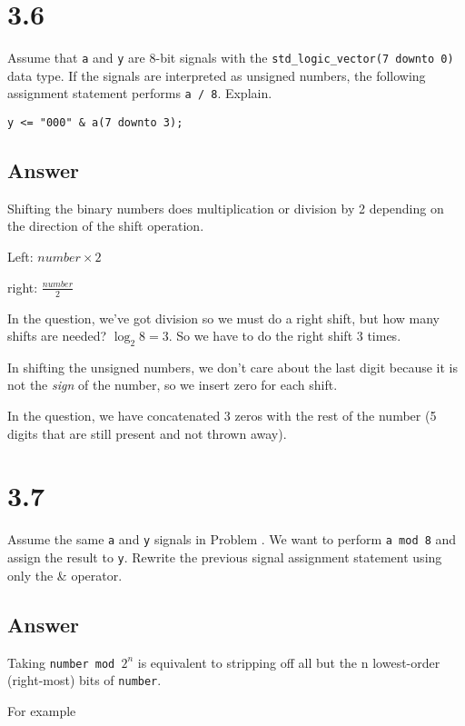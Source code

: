 \documentclass[dvipsnames, svgnames, x11names, a4paper,12pt]{article}
\begin{document}
\section{3.6}\label{3.6}
Assume that \texttt{a} and \texttt{y} are 8-bit signals with the \texttt{std\_logic\_vector(7 downto 0)}
data type. If the signals are interpreted as unsigned numbers, the following assignment
statement performs \texttt{a / 8}. Explain.

\begin{lstlisting}
y <= "000" & a(7 downto 3);
\end{lstlisting}

\subsection{Answer}
Shifting the binary numbers does multiplication or division by 2 depending on the direction of the shift operation. 
\begin{itemize*}
    \item Left: $number \times 2$
    \item right: $\frac{number}{2}$
\end{itemize*}

In the question, we've got division so we must do a right shift, but how many shifts are needed? $\log_2 8 = 3$. So we have to do the right shift 3 times.

In shifting the unsigned numbers, we don't care about the last digit because it is not the \textit{sign} of the number, so we insert zero for each shift.

In the question, we have concatenated 3 zeros with the rest of the number (5 digits that are still present and not thrown away).

\section{3.7}    
Assume the same \texttt{a} and \texttt{y} signals in Problem . We want to perform \texttt{a mod 8} and
assign the result to \texttt{y}. Rewrite the previous signal assignment statement using only the \&
operator.
\subsection{Answer}
Taking \texttt{number mod $2^n$} is equivalent to stripping off all but the n lowest-order (right-most) bits of \texttt{number}.

For example
\end{document}
